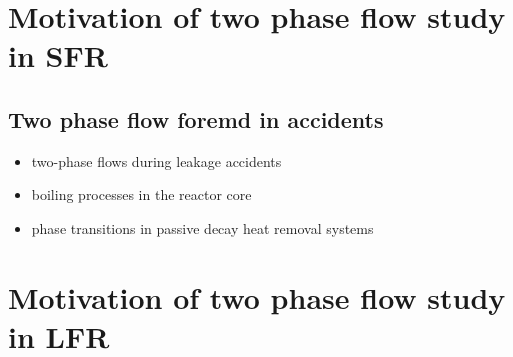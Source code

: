 \documentclass[11pt]{article}
\begin{document}
\section{Motivation of two phase flow study in SFR}
\label{sec:org5bd3acb}
\subsection{Two phase flow foremd in accidents}
\label{sec:org0178a01}
\begin{itemize}
\item two-phase flows during leakage accidents
\item boiling processes in the reactor core
\item phase transitions in passive decay heat removal systems
\end{itemize}
\section{Motivation of two phase flow study in LFR}
\label{sec:org74263e5}
\end{document}
